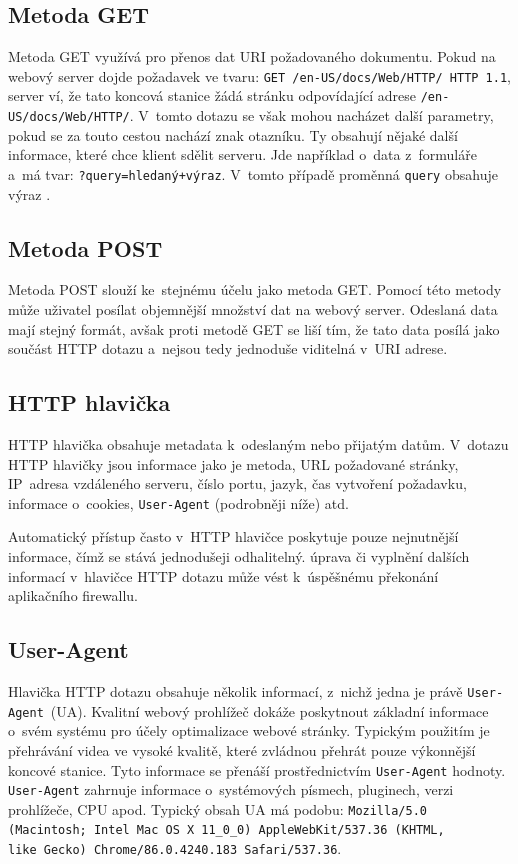 \subsection*{Metoda GET}
Metoda GET využívá pro přenos dat URI požadovaného dokumentu. Pokud na webový server dojde požadavek ve tvaru: \texttt{GET /en-US/docs/Web/HTTP/ HTTP 1.1}, server ví, že tato koncová stanice žádá stránku odpovídající adrese \texttt{/en-US/docs/Web/HTTP/}. V~tomto dotazu se však mohou nacházet další parametry, pokud se za touto cestou nachází znak otazníku. Ty obsahují nějaké další informace, které chce klient sdělit serveru. Jde například o~data z~formuláře a~má tvar: \texttt{?query=hledaný+výraz}. V~tomto případě proměnná \texttt{query} obsahuje výraz .

\subsection*{Metoda POST}
Metoda POST slouží ke~stejnému účelu jako metoda GET. Pomocí této metody může uživatel posílat objemnější množství dat na webový server. Odeslaná data mají stejný formát, avšak proti metodě GET se liší tím, že tato data posílá jako součást HTTP dotazu a~nejsou tedy jednoduše viditelná v~URI adrese. 

\subsection*{HTTP hlavička}
HTTP hlavička obsahuje metadata k~odeslaným nebo přijatým datům. V~dotazu HTTP hlavičky jsou informace jako je metoda, URL požadované stránky, IP~adresa vzdáleného serveru, číslo portu, jazyk, čas vytvoření požadavku, informace o~cookies, \texttt{User-Agent} (podrobněji níže) atd.

Automatický přístup často v~HTTP hlavičce poskytuje pouze nejnutnější informace, čímž se stává jednodušeji odhalitelný.  úprava či vyplnění dalších informací v~hlavičce HTTP dotazu může vést k~úspěšnému překonání aplikačního firewallu.

\subsection*{User-Agent}
\label{sec:user_agent}
Hlavička HTTP dotazu obsahuje několik informací, z~nichž jedna je právě \texttt{User-Agent}~(UA). Kvalitní webový prohlížeč dokáže poskytnout základní informace o~svém systému pro účely optimalizace webové stránky. Typickým použitím je přehrávání videa ve vysoké kvalitě, které zvládnou přehrát pouze výkonnější koncové stanice. Tyto informace se přenáší prostřednictvím \texttt{User-Agent} hodnoty. \texttt{User-Agent} zahrnuje informace o~systémových písmech, pluginech, verzi prohlížeče, CPU apod. Typický obsah UA má podobu: \texttt{Mozilla/5.0 (Macintosh; Intel Mac OS X 11\_0\_0) AppleWebKit/537.36 (KHTML,
\\
like Gecko) Chrome/86.0.4240.183 Safari/537.36}.

